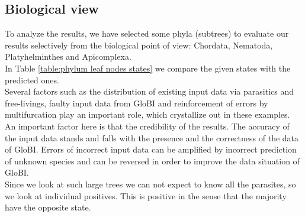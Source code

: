     \subsection{Biological view} \label{sec:results - biological view}
      To analyze the results, we have selected some phyla (subtrees) to evaluate our results 
        selectively from the biological point of view: Chordata, Nematoda, Platyhelminthes and 
        Apicomplexa. \\
      In Table \ref{table:phylum leaf nodes states} we compare the given states with the predicted ones. \\
      Several factors such as the distribution of existing input data via parasitics and free-livings, 
        faulty input data from GloBI and reinforcement of errors by multifurcation play an important 
        role, which crystallize out in these examples. \\
      An important factor here is that the credibility of the results. The accuracy of the input data 
        stands and falls with the presence and the correctness of the data of GloBI. Errors of incorrect 
        input data can be amplified by incorrect prediction of unknown species and can be reversed in 
        order to improve the data situation of GloBI. \\
      Since we look at such large trees we can not expect to know all the parasites, so we look at 
        individual positives. This is positive in the sense that the majority have the opposite state.

